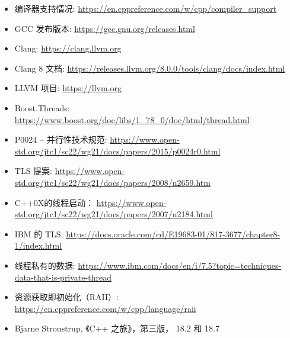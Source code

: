 

\begin{itemize}
\item
编译器支持情况: \url{https://en.cppreference.com/w/cpp/compiler_support}

\item
GCC 发布版本: \url{https://gcc.gnu.org/releases.html}

\item
Clang: \url{https://clang.llvm.org}

\item
Clang 8 文档: \url{https://releases.llvm.org/8.0.0/tools/clang/docs/index.html}

\item
LLVM 项目: \url{https://llvm.org}

\item
Boost.Threads: \url{https://www.boost.org/doc/libs/1_78_0/doc/html/thread.html}

\item
P0024 – 并行性技术规范: \url{https://www.open-std.org/jtc1/sc22/wg21/docs/papers/2015/p0024r0.html}

\item
TLS 提案: \url{https://www.open-std.org/jtc1/sc22/wg21/docs/papers/2008/n2659.htm}

\item
C++0X的线程启动： \url{https://www.open-std.org/jtc1/sc22/wg21/docs/papers/2007/n2184.html}

\item
IBM 的 TLS: \url{https://docs.oracle.com/cd/E19683-01/817-3677/chapter8-1/index.html}

\item
线程私有的数据: \url{https://www.ibm.com/docs/en/i/7.5?topic=techniques-data-that-is-private-thread}

\item
资源获取即初始化（RAII）: \url{https://en.cppreference.com/w/cpp/language/raii}

\item
Bjarne Stroustrup, 《C++ 之旅》，第三版， 18.2 和 18.7
\end{itemize}
